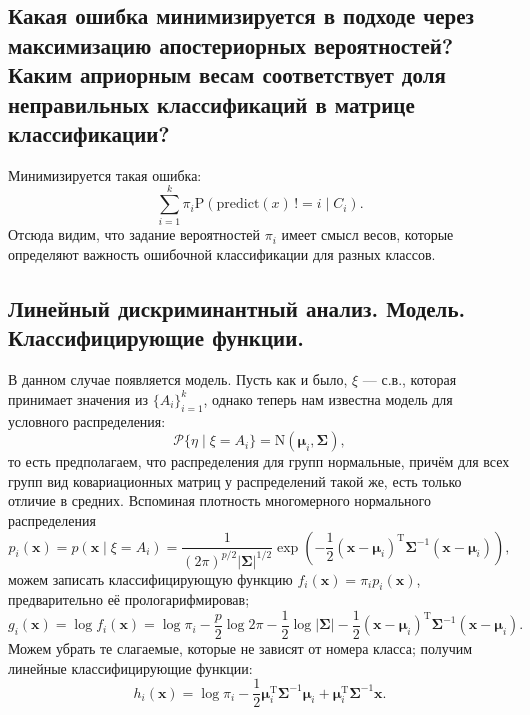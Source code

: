 \documentclass[12pt,a4paper,final]{article}
\newcommand{\1}{\mathds{1}}
\newcommand{\prob}{\mathrm{P}}
\begin{document}
\subsection{Какая ошибка минимизируется в подходе через максимизацию апостериорных вероятностей? Каким априорным весам соответствует доля неправильных классификаций в матрице классификации?}

Минимизируется такая ошибка:
$$
\sum_{i = 1}^k \pi_i \prob (\mathrm{predict}(x)\, != i \mid 	C_i).
$$
Отсюда видим, что задание вероятностей $\pi_i$ имеет смысл весов, которые определяют важность ошибочной классификации для разных классов.  


\subsection{Линейный дискриминантный анализ. Модель. Классифицирующие функции.}

В данном случае появляется модель. Пусть как и было, $\xi$ --- с.в., которая принимает значения из $\{A_i\}_{i = 1}^k$, однако теперь нам известна модель для условного распределения:
$$
\mathcal P \{\eta \mid \xi = A_i\} = \mathrm{N}(\bm \mu_i, \bm \Sigma),  
$$
то есть предполагаем, что распределения для групп нормальные, причём для всех групп вид ковариационных матриц у распределений такой же, есть только отличие в средних. 
Вспоминая плотность многомерного нормального распределения
$$
p_i(\bm x) = p(\bm x \mid \xi = A_i) = \frac{1}{(2 \pi)^{p/2} |\bm \Sigma|^{1/2}} \exp{\left( -\frac{1}{2} (\bm x - \bm \mu_i)^\mathrm{T} \bm \Sigma^{-1} (\bm x - \bm \mu_i) \right)},
$$
можем записать классифицирующую функцию $f_i(\bm x) = \pi_i p_i(\bm x)$, предварительно её прологарифмировав;
$$
g_i(\bm x) = \log f_i(\bm x) = \log \pi_i - \frac{p}{2} \log 2 \pi - \frac{1}{2} \log |\bm \Sigma| -\frac{1}{2} (\bm x - \bm \mu_i)^\mathrm{T} \bm \Sigma^{-1} (\bm x - \bm \mu_i).
$$
Можем убрать те слагаемые, которые не зависят от номера класса; получим линейные классифицирующие функции:
$$
h_i(\bm x) = \log \pi_i - \frac{1}{2} \bm \mu_i^\mathrm{T} \bm \Sigma^{-1} \bm \mu_i +  \bm \mu_i^\mathrm{T} \bm \Sigma^{-1} \bm x.
$$
\end{document}
